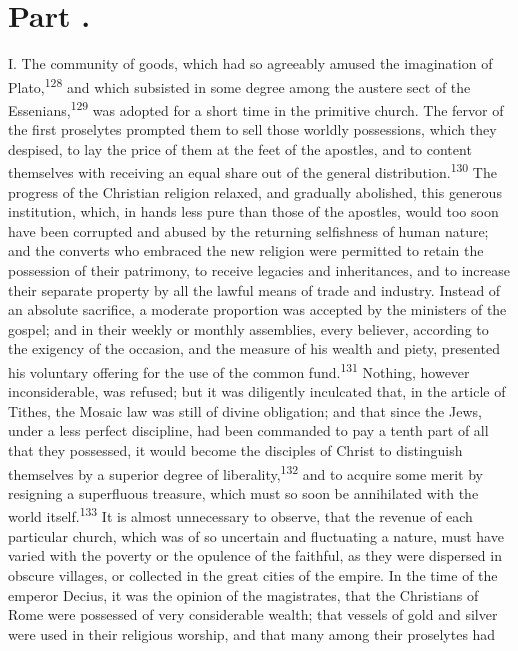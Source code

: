 \section{Part \thesection.}

I. The community of goods, which had so agreeably amused the
imagination of Plato,\textsuperscript{128} and which subsisted in some degree
among the austere sect of the Essenians,\textsuperscript{129} was adopted for a
short time in the primitive church. The fervor of the first
proselytes prompted them to sell those worldly possessions, which
they despised, to lay the price of them at the feet of the
apostles, and to content themselves with receiving an equal share
out of the general distribution.\textsuperscript{130} The progress of the
Christian religion relaxed, and gradually abolished, this
generous institution, which, in hands less pure than those of the
apostles, would too soon have been corrupted and abused by the
returning selfishness of human nature; and the converts who
embraced the new religion were permitted to retain the possession
of their patrimony, to receive legacies and inheritances, and to
increase their separate property by all the lawful means of trade
and industry. Instead of an absolute sacrifice, a moderate
proportion was accepted by the ministers of the gospel; and in
their weekly or monthly assemblies, every believer, according to
the exigency of the occasion, and the measure of his wealth and
piety, presented his voluntary offering for the use of the common
fund.\textsuperscript{131} Nothing, however inconsiderable, was refused; but it
was diligently inculcated that, in the article of Tithes, the
Mosaic law was still of divine obligation; and that since the
Jews, under a less perfect discipline, had been commanded to pay
a tenth part of all that they possessed, it would become the
disciples of Christ to distinguish themselves by a superior
degree of liberality,\textsuperscript{132} and to acquire some merit by resigning
a superfluous treasure, which must so soon be annihilated with
the world itself.\textsuperscript{133} It is almost unnecessary to observe, that
the revenue of each particular church, which was of so uncertain
and fluctuating a nature, must have varied with the poverty or
the opulence of the faithful, as they were dispersed in obscure
villages, or collected in the great cities of the empire. In the
time of the emperor Decius, it was the opinion of the
magistrates, that the Christians of Rome were possessed of very
considerable wealth; that vessels of gold and silver were used in
their religious worship, and that many among their proselytes had
